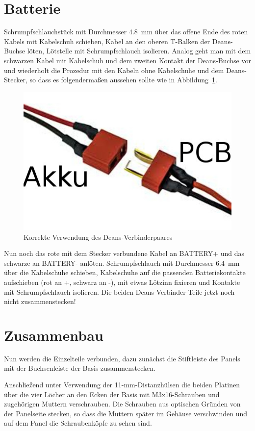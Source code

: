 \documentclass[paper=a4, open=any, numbers=noenddot]{scrbook}
\begin{document}
		\section{Batterie}

			Schrumpfschlauchstück mit Durchmesser \SI{4,8}{\milli\metre} über das offene Ende des roten Kabels mit Kabelschuh schieben, Kabel an den oberen T-Balken der Deans-Buchse löten, Lötstelle mit Schrumpfschlauch isolieren. Analog geht man mit dem schwarzen Kabel mit Kabelschuh und dem zweiten Kontakt der Deans-Buchse vor und wiederholt die Prozedur mit den Kabeln ohne Kabelschuhe und dem Deans-Stecker, so dass es folgendermaßen aussehen sollte wie in Abbildung~\ref{fig:deans}.

			\begin{figure}
				\centering\includegraphics[width=.35\textwidth]{Bilder/deans}
				\caption{Korrekte Verwendung des Deans-Verbinder\-paares}
				\label{fig:deans}
			\end{figure}

			Nun noch das rote mit dem Stecker verbundene Kabel an BATTERY+ und das schwarze an BATTERY- anlöten. Schrumpfschlauch mit Durchmesser \SI{6,4}{\milli\metre} über die Kabelschuhe schieben, Kabelschuhe auf die passenden Batteriekontakte aufschieben (rot an +, schwarz an -), mit etwas Lötzinn fixieren und Kontakte mit Schrumpfschlauch isolieren. Die beiden Deans-Verbinder-Teile jetzt noch nicht zusammenstecken!

		\section{Zusammenbau}
			Nun werden die Einzelteile verbunden, dazu zunächst die Stiftleiste des Panels mit der Buchsenleiste der Basis zusammenstecken.

			Anschließend unter Verwendung der 11-mm-Distanzhülsen die beiden Platinen über die vier Löcher an den Ecken der Basis mit M3x16-Schrauben und zugehörigen Muttern verschrauben. Die Schrauben aus optischen Gründen von der Panelseite stecken, so dass die Muttern später im Gehäuse verschwinden und auf dem Panel die Schraubenköpfe zu sehen sind.
\end{document}
